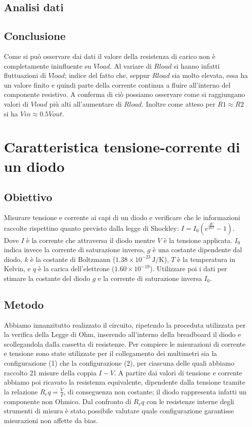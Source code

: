 \documentclass[a4paper]{article}
\begin{document}
\subsection{Analisi dati}
\subsection{Conclusione}
Come si può osservare dai dati il valore della resistenza di carico non è completamente ininfluente su \( \mathit{Vload} \).
Al variare di \( \mathit{Rload} \) si hanno infatti fluttuazioni di \( \mathit{Vload} \); indice del fatto che, seppur \( \mathit{Rload} \) sia molto elevata, essa ha un valore finito e quindi
parte della corrente continua a fluire all'interno del componente resistivo. A conferma di ciò possiamo osservare come si raggiungano valori di \( \mathit{Vload} \) più alti all'aumentare di \( \mathit{Rload} \).
Inoltre come atteso per \( \mathit{R1 \approx R2} \) si ha \( \mathit{Vin
	\approx 0.5Vout} \).

\section{Caratteristica tensione-corrente di un diodo}
\subsection{Obiettivo}
Misurare tensione e corrente ai capi di un diodo e verificare che le informazioni raccolte rispettino quanto previsto dalla legge di Shockley: \(I = I_0 \left( e^{\frac{qV}{gkT}} - 1 \right)\).
Dove \( I \) è la corrente che attraversa il diodo mentre \( V \) è la tensione applicata. \( I_0 \) indica invece la corrente di saturazione inversa, \( g \) è una costante dipendente dal diodo,
\( k \) è la costante di Boltzmann (\( 1.38 \times 10^{-23} \, \text{J/K} \)), \( T \) è la temperatura in Kelvin, e \( q \) è la carica dell'elettrone (\( 1.60 \times 10^{-19} \)).
Utilizzare poi i dati per stimare la costante del diodo \( g \) e la corrente di saturazione inversa \( I_0 \).
\subsection{Metodo}
Abbiamo innanzitutto realizzato il circuito, ripetendo la proceduta utilizzata per la verifica della Legge di Ohm, inserendo all'interno della breadboard il diodo e scollegandola dalla cassetta di resistenze.
Per compiere le misurazioni di corrente e tensione sono state utilizzate per il collegamento dei multimetri sia la configurazione (1) che la configurazione (2),
per ciascuna delle quali abbiamo raccolto 21 misure della coppia \( I-V \). A partire dai valori di tensione e corrente abbiamo poi ricavato la resistenza equivalente,
dipendente dalla tensione tramite la relazione \( R_eq = \frac {V}{I} \), di conseguenza non costante; il diodo rappresenta infatti un componente non Ohmico.
Dal confronto di \(R_eq\) con le resistenze interne degli strumenti di misura è stato possibile valutare quale configurazione garantisse misurazioni non affette da bias.
\end{document}
